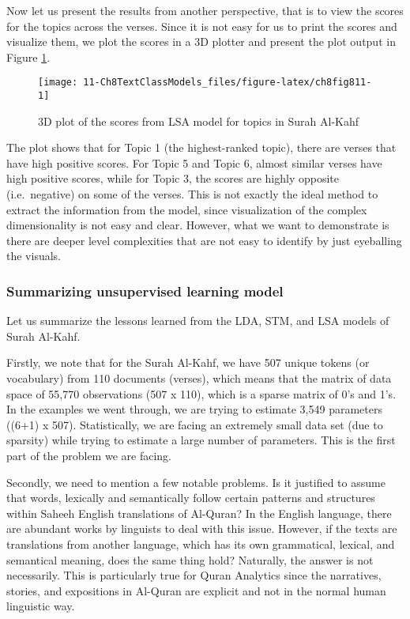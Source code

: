 \documentclass[
]{article}
\begin{document}
Now let us present the results from another perspective, that is to view the scores for the topics across the verses. Since it is not easy for us to print the scores and visualize them, we plot the scores in a 3D plotter and present the plot output in Figure \ref{fig:ch8fig811}.

\begin{figure}

{\centering \texttt{[image: 11-Ch8TextClassModels\_files/figure-latex/ch8fig811-1]} 

}

\caption{3D plot of the scores from LSA model for topics in Surah Al-Kahf}\label{fig:ch8fig811}
\end{figure}

The plot shows that for Topic 1 (the highest-ranked topic), there are verses that have high positive scores. For Topic 5 and Topic 6, almost similar verses have high positive scores, while for Topic 3, the scores are highly opposite (i.e.~negative) on some of the verses. This is not exactly the ideal method to extract the information from the model, since visualization of the complex dimensionality is not easy and clear. However, what we want to demonstrate is there are deeper level complexities that are not easy to identify by just eyeballing the visuals.

\hypertarget{summarizing-unsupervised-learning-model}{%
\subsubsection{Summarizing unsupervised learning model}\label{summarizing-unsupervised-learning-model}}

Let us summarize the lessons learned from the LDA, STM, and LSA models of Surah Al-Kahf.

Firstly, we note that for the Surah Al-Kahf, we have 507 unique tokens (or vocabulary) from 110 documents (verses), which means that the matrix of data space of 55,770 observations (507 x 110), which is a sparse matrix of 0's and 1's. In the examples we went through, we are trying to estimate 3,549 parameters ((6+1) x 507). Statistically, we are facing an extremely small data set (due to sparsity) while trying to estimate a large number of parameters. This is the first part of the problem we are facing.

Secondly, we need to mention a few notable problems. Is it justified to assume that words, lexically and semantically follow certain patterns and structures within Saheeh English translations of Al-Quran? In the English language, there are abundant works by linguists to deal with this issue. However, if the texts are translations from another language, which has its own grammatical, lexical, and semantical meaning, does the same thing hold? Naturally, the answer is not necessarily. This is particularly true for Quran Analytics since the narratives, stories, and expositions in Al-Quran are explicit and not in the normal human linguistic way.
\end{document}
